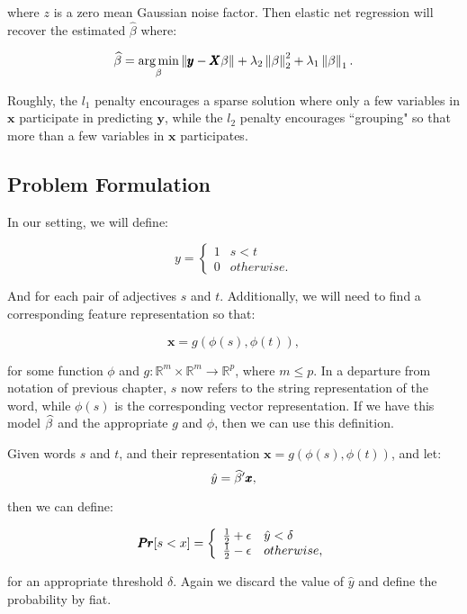 where $z$ is a zero mean Gaussian noise factor. Then elastic net regression will recover the estimated $\widehat{\mathcal{\beta}}$ where:

	\[
		\widehat{\mathcal{\beta}} = \operatorname*{arg\,min}_{\beta} \left\lVert\pmb{y} - \pmb{X} \mathcal{\beta}\right\rVert + \lambda_2 \left\lVert\mathcal{\beta}\right\rVert_2^2 + \lambda_1 \left\lVert\mathcal{\beta}\right\rVert_1.
	\]

Roughly, the $l_1$ penalty encourages a sparse solution where only a few variables in $\pmb{x}$ participate in predicting $\pmb{y}$, while the $l_2$ penalty encourages ``grouping" so that more than a few variables in $\pmb{x}$ participates. 

\subsection{Problem Formulation}

In our setting, we will define:

\[   
y = \left\{
\begin{array}{ll}
      1 & s < t \\
      0 & otherwise.
\end{array} 
\right. 
\]

And for each pair of adjectives $s$ and $t$. Additionally, we will need to find a corresponding feature representation so that:

	\[
		\pmb{x} = g(\phi(s), \phi(t)),
	\]

for some function $\phi$ and $g : \mathbb{R}^m \times \mathbb{R}^m \rightarrow \mathbb{R}^p$, where $m \leq p$. In a departure from notation of previous chapter, $s$ now refers to the string representation of the word, while $\phi(s)$ is the corresponding vector representation. If we have this model $\widehat{\mathcal{\beta}}$ and the appropriate $g$ and $\phi$, then we can use this definition.

\begin{definition}

Given words $s$ and $t$, and their representation $\pmb{x} = g(\phi(s), \phi(t))$, and let:
	\[
		\hat{y} = \widehat{\mathcal{\beta}}' \pmb{x},
	\]

then we can define:

\[   
\pmb{Pr}[s < x ] = \left\{
\begin{array}{ll}
      \frac{1}{2} + \epsilon & \hat{y} < \delta \\
      \frac{1}{2} - \epsilon & otherwise,
\end{array} 
\right. 
\]

for an appropriate threshold $\delta$. Again we discard the value of $\hat{y}$ and define the probability by fiat.
\end{definition}

